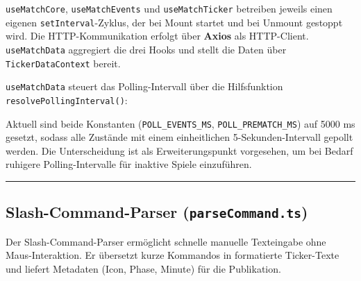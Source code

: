 \texttt{useMatchCore}, \texttt{useMatchEvents} und
\texttt{useMatchTicker} betreiben jeweils einen eigenen
\texttt{setInterval}-Zyklus, der bei Mount startet und bei Unmount
gestoppt wird. Die HTTP-Kommunikation erfolgt über \textbf{Axios} als
HTTP-Client. \texttt{useMatchData} aggregiert die drei Hooks und stellt
die Daten über \texttt{TickerDataContext} bereit.

\texttt{useMatchData} steuert das Polling-Intervall über die
Hilfsfunktion \texttt{resolvePollingInterval()}:

\begin{Shaded}
\begin{Highlighting}[]
  \OperatorTok{:}  \OperatorTok{|} \NormalTok{)}\OperatorTok{:} \NormalTok{ \{}
  \OperatorTok{===}  \OperatorTok{||}\OperatorTok{===} \NormalTok{) }\OperatorTok{;} 
  \OperatorTok{==} \NormalTok{) }\OperatorTok{;} 
  \OperatorTok{;} 
\NormalTok{\}}
\end{Highlighting}
\end{Shaded}

Aktuell sind beide Konstanten (\texttt{POLL\_EVENTS\_MS},
\texttt{POLL\_PREMATCH\_MS}) auf 5000 ms gesetzt, sodass alle Zustände
mit einem einheitlichen 5-Sekunden-Intervall gepollt werden. Die
Unterscheidung ist als Erweiterungspunkt vorgesehen, um bei Bedarf
ruhigere Polling-Intervalle für inaktive Spiele einzuführen.

\begin{center}\rule{0.5\linewidth}{0.5pt}\end{center}

\subsection{\texorpdfstring{Slash-Command-Parser
(\texttt{parseCommand.ts})}{Slash-Command-Parser (parseCommand.ts)}}\label{slash-command-parser-parsecommand.ts}

Der Slash-Command-Parser ermöglicht schnelle manuelle Texteingabe ohne
Maus-Interaktion. Er übersetzt kurze Kommandos in formatierte
Ticker-Texte und liefert Metadaten (Icon, Phase, Minute) für die
Publikation.

